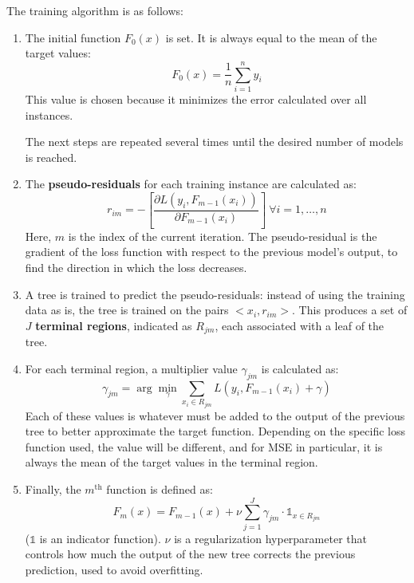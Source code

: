 The training algorithm is as follows:
\begin{enumerate}
    \item The initial function $F_0(x)$ is set. It is always equal to the mean of the target values:
    \begin{equation*}
        F_0(x) = \frac{1}{n} \sum_{i=1}^n y_i
    \end{equation*}
    This value is chosen because it minimizes the error calculated over all instances.

    The next steps are repeated several times until the desired number of models is reached.

    \item The \textbf{pseudo-residuals} for each training instance are calculated as:
    \begin{equation*}
        r_{im} = - \left [ \dfrac{\partial L(y_i, F_{m-1}(x_i))}{\partial F_{m-1}(x_i)} \right ] \ \forall i = 1, \dots, n
    \end{equation*}
    Here, $m$ is the index of the current iteration. The pseudo-residual is the gradient of the loss function with respect to the previous model's output, to find the direction in which the loss decreases.

    \item A tree is trained to predict the pseudo-residuals: instead of using the training data as is, the tree is trained on the pairs $<x_i, r_{im}>$. This produces a set of $J$ \textbf{terminal regions}, indicated as $R_{jm}$, each associated with a leaf of the tree.
    
    \item For each terminal region, a multiplier value $\gamma_{jm}$ is calculated as:
    \begin{equation*}
        \gamma_{jm} = \arg\min_{\gamma} \sum_{x_i \in R_{jm}} L(y_i, F_{m-1}(x_i) + \gamma)
    \end{equation*}
    Each of these values is whatever must be added to the output of the previous tree to better approximate the target function. Depending on the specific loss function used, the value will be different, and for MSE in particular, it is always the mean of the target values in the terminal region.

    \item Finally, the $m^{\text{th}}$ function is defined as:
    \begin{equation*}
        F_m(x) = F_{m-1}(x) + \nu \sum_{j=1}^J \gamma_{jm} \cdot \mathds{1}_{x \in R_{jm}}
    \end{equation*}
    ($\mathds{1}$ is an indicator function). $\nu$ is a regularization hyperparameter that controls how much the output of the new tree corrects the previous prediction, used to avoid overfitting.
\end{enumerate}

